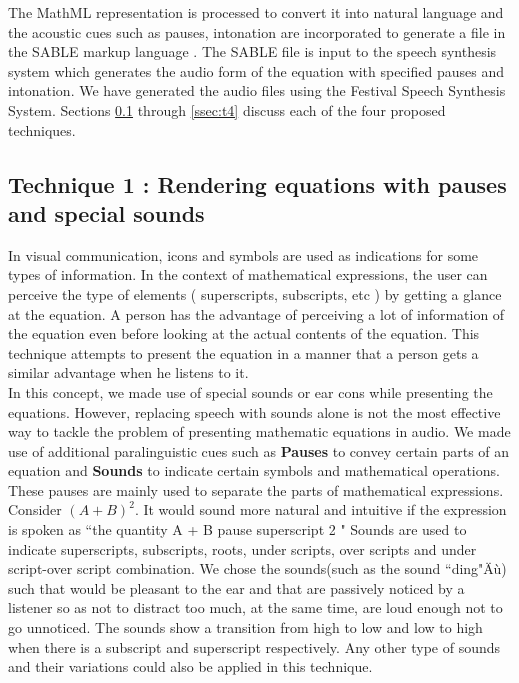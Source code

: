 \documentclass{article}
\begin{document}
The MathML representation is processed to convert it into natural language and the acoustic cues such as pauses, intonation are incorporated to generate a file in the SABLE markup language \cite{sproat1998sable}. 
The SABLE file is input to the speech synthesis system which generates the audio form of the equation with specified pauses and intonation. We have generated the audio files using the Festival Speech Synthesis System\cite{black2002festival}. 
Sections \ref{ssec:t1} through \ref{ssec:t4} discuss each of the four proposed techniques. 



\subsection{ Technique 1 : Rendering equations with pauses and special sounds}
\label{ssec:t1}

In visual communication, icons and symbols are used as indications for some types of information. In the context of mathematical expressions, the user can perceive the type of elements ( superscripts, subscripts, etc ) by getting a glance at the equation. A person has the advantage of perceiving a lot of information of the equation even before looking at the actual contents of the equation. This technique attempts to present the equation in a manner that a person gets a similar advantage when he listens to it.\\

 In this concept, we made use of special sounds or ear cons while presenting the equations. However, replacing speech with sounds alone is not the most effective way to tackle the problem of presenting mathematic equations in audio. We made use of additional paralinguistic cues such as  \textbf{Pauses} to convey certain parts of an equation and \textbf{Sounds} to indicate certain symbols and mathematical operations.
These pauses are mainly used to separate the parts of mathematical expressions. Consider $(A+B)^2$.
It would sound more natural and intuitive if the expression is spoken as ``the quantity A + B pause superscript 2 " 
Sounds are used to indicate superscripts, subscripts, roots, under scripts, over scripts and under script-over script combination.
We chose the sounds(such as the sound ``ding"Äù) such that would be pleasant to the ear and that are passively noticed by a listener so as not to distract too much, at the same time, are loud enough not to go unnoticed. The sounds show a transition from high to low and low to high when there is a subscript and superscript respectively. Any other type of sounds  and their variations could also be applied in this technique.
\end{document}

